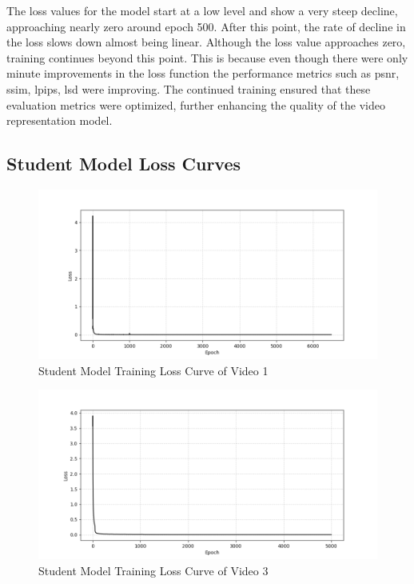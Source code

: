 The loss values for the model start at a low level and show a very steep decline, approaching nearly zero around epoch 500. After this point, the rate of decline in the loss slows down almost being linear. Although the loss value approaches zero, training continues beyond this point. This is because even though there were only minute improvements in the loss function the performance metrics such as \gls{psnr}, \gls{ssim}, \gls{lpips}, \gls{lsd} were improving. The continued training ensured that these evaluation metrics were optimized, further enhancing the quality of the video representation model.

\subsection{Student Model Loss Curves}

\begin{figure}[H]
    \centering
    \includegraphics[width=1\linewidth,height=0.6\linewidth]{assets/quantization/student_vvsa_loss_curve.png}
    \caption{Student Model Training Loss Curve of Video 1}
    \label{fig:student-video-loss-curve-1}
\end{figure}

\begin{figure}[H]
    \centering
    \includegraphics[width=1\linewidth,height=0.6\linewidth]{assets/quantization/student_rick_loss_curve.png}
    \caption{Student Model Training Loss Curve of Video 3}
    \label{fig:student-video-loss-curve-3}
\end{figure}

